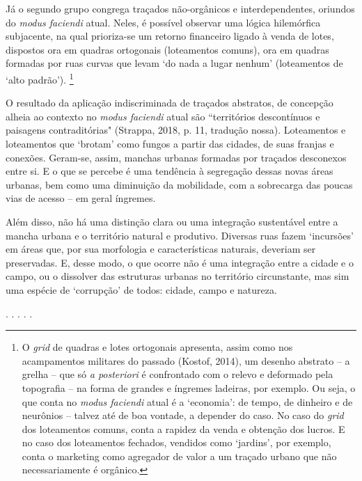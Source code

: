\documentclass[]{report}
\begin{document}
	Já o segundo grupo congrega traçados não-orgânicos e interdependentes, oriundos do \textit{modus faciendi} atual. Neles, é possível observar uma lógica hilemórfica subjacente, na qual prioriza-se um retorno financeiro ligado à venda de lotes, dispostos ora em quadras ortogonais (loteamentos comuns), ora em quadras formadas por ruas curvas que levam `do nada a lugar nenhum' (loteamentos de `alto padrão').%
		\footnote[4]{O \textit{grid} de quadras e lotes ortogonais apresenta, assim como nos acampamentos militares do passado (Kostof, 2014), um desenho abstrato – a grelha – que só \textit{a posteriori} é confrontado com o relevo e deformado pela topografia – na forma de grandes e íngremes ladeiras, por exemplo. Ou seja, o que conta no \textit{modus faciendi} atual é a `economia': de tempo, de dinheiro e de neurônios – talvez até de boa vontade, a depender do caso. No caso do \textit{grid} dos loteamentos comuns, conta a rapidez da venda e obtenção dos lucros. E no caso dos loteamentos fechados, vendidos como `jardins', por exemplo, conta o marketing como agregador de valor a um traçado urbano que não necessariamente é orgânico.}
	
	O resultado da aplicação indiscriminada de traçados abstratos, de concepção alheia ao contexto no \textit{modus faciendi} atual são ``territórios descontínuos e paisagens contraditórias" (Strappa, 2018, p. 11, tradução nossa). Loteamentos e loteamentos que `brotam' como fungos a partir das cidades, de suas franjas e conexões. Geram-se, assim, manchas urbanas formadas por traçados desconexos entre si. E o que se percebe é uma tendência à segregação dessas novas áreas urbanas, bem como uma diminuição da mobilidade, com a sobrecarga das poucas vias de acesso – em geral íngremes.

	Além disso, não há uma distinção clara ou uma integração sustentável entre a mancha urbana e o território natural e produtivo. Diversas ruas fazem `incursões' em áreas que, por sua morfologia e características naturais, deveriam ser preservadas. E, desse modo, o que ocorre não é uma integração entre a cidade e o campo, ou o dissolver das estruturas urbanas no território circunstante, mas sim uma espécie de `corrupção' de todos: cidade, campo e natureza.

	\begin{center}
		. . . . .
	\end{center}
\end{document}
